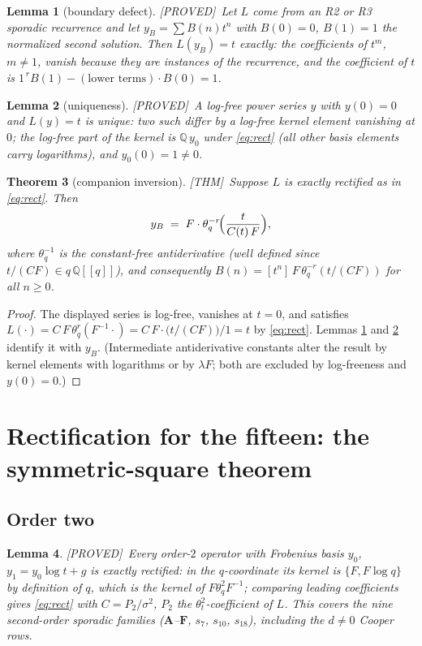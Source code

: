 \documentclass[11pt,reqno]{amsart}
\theoremstyle{plain}
\newtheorem{theorem}{Theorem}[section]
\newtheorem{lemma}[theorem]{Lemma}
\theoremstyle{definition}
\theoremstyle{remark}
\newcommand{\Q}{\mathbb{Q}}
\newcommand{\thq}{\theta_q}
\newcommand{\tht}{\theta_t}
\newcommand{\Thm}{\textup{\textsf{[THM]}}}
\newcommand{\Proved}{\textup{\textsf{[PROVED]}}}
\begin{document}
\begin{lemma}[boundary defect]\label{lem:defect}
\Proved\
Let $L$ come from an R2 or R3 sporadic recurrence and let $y_B=\sum
B(n)t^n$ with $B(0)=0$, $B(1)=1$ the normalized second solution. Then
$L(y_B)=t$ exactly: the coefficients of $t^m$, $m\neq1$, vanish because
they are instances of the recurrence, and the coefficient of $t$ is
$1^{\,r}B(1)-(\text{lower terms})\cdot B(0)=1$.
\end{lemma}

\begin{lemma}[uniqueness]\label{lem:unique}
\Proved\
A log-free power series $y$ with $y(0)=0$ and $L(y)=t$ is unique: two such
differ by a log-free kernel element vanishing at $0$; the log-free part of
the kernel is $\Q\,y_0$ under \eqref{eq:rect} (all other basis elements
carry logarithms), and $y_0(0)=1\neq0$.
\end{lemma}

\begin{theorem}[companion inversion]\label{thm:inversion}
\Thm\
Suppose $L$ is exactly rectified as in \eqref{eq:rect}. Then
\[
y_B\;=\;F\cdot\thq^{-r}\!\Bigl(\frac{t}{C(t)\,F}\Bigr),
\]
where $\thq^{-1}$ is the constant-free antiderivative (well defined since
$t/(CF)\in q\,\Q[[q]]$), and consequently
$B(n)=[t^n]\,F\,\thq^{-r}(t/(CF))$ for all $n\ge0$.
\end{theorem}

\begin{proof}
The displayed series is log-free, vanishes at $t=0$, and satisfies
$L(\cdot)=C\,F\,\thq^r(F^{-1}\cdot)=C\,F\cdot\bigl(t/(CF)\bigr)/1=t$ by
\eqref{eq:rect}. Lemmas \ref{lem:defect} and \ref{lem:unique} identify it
with $y_B$. (Intermediate antiderivative constants alter the result by
kernel elements with logarithms or by $\lambda F$; both are excluded by
log-freeness and $y(0)=0$.)
\end{proof}

\section{Rectification for the fifteen: the symmetric-square theorem}
\label{sec:sym2}

\subsection{Order two}
\begin{lemma}\label{lem:r2}
\Proved\
Every order-$2$ operator with Frobenius basis $y_0$, $y_1=y_0\log t+g$ is
exactly rectified: in the $q$-coordinate its kernel is
$\{F,F\log q\}$ by definition of $q$, which is the kernel of
$F\thq^2F^{-1}$; comparing leading coefficients gives
\eqref{eq:rect} with $C=P_2/\sigma^2$, $P_2$ the $\tht^2$-coefficient of
$L$. This covers the nine second-order sporadic families
($\mathbf A$--$\mathbf F$, $s_7$, $s_{10}$, $s_{18}$), including the
$d\neq0$ Cooper rows.
\end{lemma}
\end{document}
